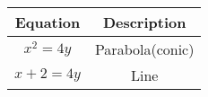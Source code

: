 \begin{tabular}{|c|c|}
	\hline
	Equation & Description\\
	\hline
	$x^{2} = 4y$ & Parabola(conic)\\
	\hline
	$x + 2 = 4y $ & Line\\
	\hline
\end{tabular}
